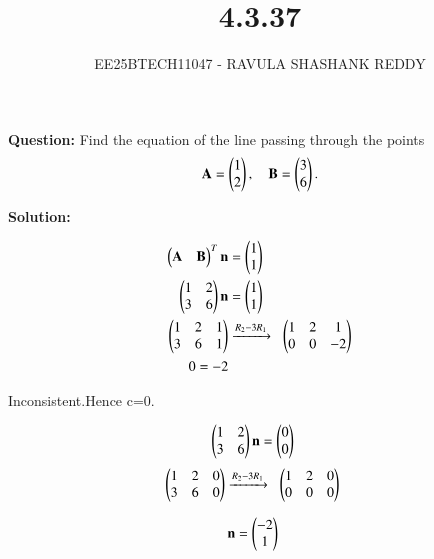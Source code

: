 \documentclass[journal]{article}
\begin{document}
	
	
	\vspace{3cm}
	
\title{4.3.37}
\author{EE25BTECH11047 - RAVULA SHASHANK REDDY}
\maketitle
\hrulefill
\bigskip 

\renewcommand{\thetable}{\theenumi}
\setlength{\intextsep}{10pt}

\textbf{Question:}  
Find the equation of the line passing through the points  
\[
\mathbf{A} = \begin{pmatrix}1 \\ 2\end{pmatrix}, 
\quad 
\mathbf{B} = \begin{pmatrix}3 \\ 6\end{pmatrix}.
\]

\textbf{Solution:}  

\begin{align}
\begin{pmatrix}\mathbf{A}&\mathbf{B}\end{pmatrix}^T\mathbf{n} &= \begin{pmatrix}1\\1\end{pmatrix}\\
\begin{pmatrix}1 & 2 \\ 3 & 6\end{pmatrix}\mathbf{n} &= \begin{pmatrix}1 \\ 1\end{pmatrix}\\ 
\begin{pmatrix}1 & 2 & 1 \\ 3 & 6 & 1\end{pmatrix} & 
\xrightarrow{R_2 - 3R_1}\;\;
\begin{pmatrix}1 & 2 & 1 \\ 0 & 0 & -2\end{pmatrix} \\
0=-2
\end{align}
\begin{center}
Inconsistent.Hence c=0.
\end{center}
\begin{align}
\begin{pmatrix}1 & 2 \\ 3 & 6\end{pmatrix}\mathbf{n} &= \begin{pmatrix}0 \\ 0\end{pmatrix} 
\end{align}
\begin{align}
\begin{pmatrix}1 & 2 & 0 \\ 3 & 6 & 0\end{pmatrix} & 
\xrightarrow{R_2 - 3R_1}\;\;
\begin{pmatrix}1 & 2 & 0 \\ 0 & 0 & 0\end{pmatrix} 
\end{align}

\begin{align}
\mathbf{n} &= \begin{pmatrix}-2 \\ 1\end{pmatrix}
\end{align}
\end{document}
